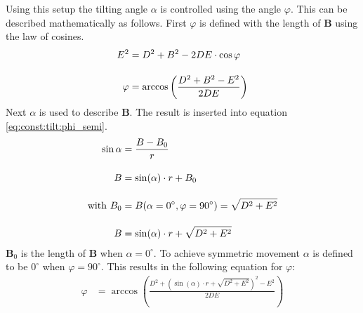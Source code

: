 \p
Using this setup the tilting angle $\alpha$ is controlled using the angle $\varphi$. This can be described mathematically as follows. First $\varphi$ is defined with the length of \textbf{B} using the law of cosines.
%
\begin{align}
  E^2     &= D^2 + B^2 - 2DE \cdot \cos \varphi \pmath
  \varphi &= \arccos \left( \frac{D^2 + B^2 - E^2}{2DE} \right) \label{eq:const:tilt:phi_semi}
\end{align}
%
Next $\alpha$ is used to describe \textbf{B}. The result is inserted into equation \ref{eq:const:tilt:phi_semi}.
%
\begin{align}
  \sin \alpha &= \frac{B - B_0}{r}\pmath
  B           &= \sin (\alpha) \cdot r + B_0\pmath
  \mathrm{with~} B_0 &= B(\alpha = 0^\circ, \varphi = 90^\circ) = \sqrt{D^2 + E^2}\pmath
  B           &= \sin (\alpha) \cdot r + \sqrt{D^2 + E^2}
\end{align}
%
\textbf{B$_0$} is the length of \textbf{B} when $\alpha = 0^\circ$. To achieve symmetric movement $\alpha$ is defined to be $0^\circ$ when $\varphi = 90^\circ$. This results in the following equation for $\varphi$:
%
\begin{align}
  \varphi &= \arccos \left( \frac{D^2 + (\sin (\alpha) \cdot r + \sqrt{D^2 + E^2})^2 - E^2}{2DE} \right)
\end{align}

